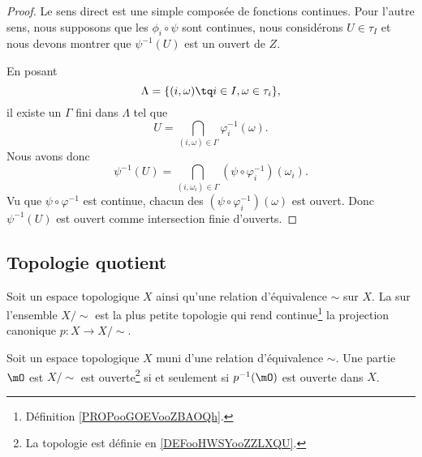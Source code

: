 \begin{proof}
	Le sens direct est une simple composée de fonctions continues. Pour l'autre sens, nous supposons que les \( \phi_i\circ\psi\) sont continues, nous considérons \( U\in \tau_I\) et nous devons montrer que \( \psi^{-1}(U)\) est un ouvert de \( Z\).

	En posant
	\begin{equation}
		\Lambda=\{ (i,\omega)\tq i\in I,\omega\in \tau_i \},
	\end{equation}
	il existe un \( \Gamma\) fini dans \( \Lambda\) tel que
	\begin{equation}
		U=\bigcap_{(i,\omega)\in \Gamma}\varphi_i^{-1}(\omega).
	\end{equation}
	Nous avons donc
	\begin{equation}
		\psi^{-1}(U)=\bigcap_{(i,\omega_i)\in\Gamma}(\psi\circ\varphi_i^{-1})(\omega_i).
	\end{equation}
	Vu que \( \psi\circ\varphi^{-1}\) est continue, chacun des \( (\psi\circ\varphi_i^{-1})(\omega)\) est ouvert. Donc \( \psi^{-1}(U)\) est ouvert comme intersection finie d'ouverts.
\end{proof}


\subsection{Topologie quotient}

\begin{definition}        \label{DEFooHWSYooZZLXQU}
	Soit un espace topologique \( X\) ainsi qu'une relation d'équivalence \( \sim\) sur \( X\). La  sur l'ensemble \( X/\sim\) est la plus petite topologie qui rend continue\footnote{Définition \ref{PROPooGOEVooZBAOQh}.} la projection canonique \( p\colon X\to X/\sim\).
\end{definition}

\begin{proposition}     \label{PROPooDRPLooONCwYs}
	Soit un espace topologique \( X\) muni d'une relation d'équivalence \( \sim\). Une partie \( \mO\) est \( X/\sim\) est ouverte\footnote{La topologie est définie en \ref{DEFooHWSYooZZLXQU}.} si et seulement si \( p^{-1}(\mO)\) est ouverte dans \( X\).
\end{proposition}

